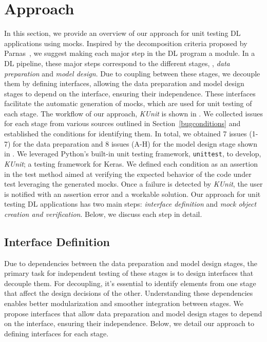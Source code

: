 \section{Approach}
\label{sec:Approach}


In this section, we provide an overview of our approach for unit testing DL applications using mocks.
Inspired by the decomposition criteria proposed by Parnas~\cite{parnas1972criteria}, we suggest making each major step in the DL program a module.
In a DL pipeline, these major steps correspond to the different stages, \ie, \textit{data preparation} and \textit{model design}.
Due to coupling between these stages, we decouple them by defining interfaces, allowing the data preparation and model design stages to depend on the interface, ensuring their independence. 
These interfaces facilitate the automatic generation of mocks, which are used for unit testing of each stage.
The workflow of our approach, {\em KUnit} is shown in .
We collected issues for each stage from various sources outlined in Section~\ref{bugconditions} and established the conditions for identifying them.
In total, we obtained 7 issues (1-7) for the data preparation
and 8 issues (A-H) for the model design stage shown in . 
We 
leveraged Python’s built-in unit testing framework, \texttt{unittest},
to develop, {\em KUnit}; a testing framework for Keras.
We defined each condition as an assertion in the test method aimed at verifying the expected behavior of the code under test leveraging the generated mocks.
Once a failure is detected by {\em KUnit}, the user is notified with an assertion error and a workable solution. 
Our approach 
for unit testing DL applications has two main steps: \textit{interface definition} and \textit{mock object creation and verification}. 
Below, we discuss each step in detail.


\subsection{Interface Definition}
Due to dependencies between the data preparation and model design stages, the primary task for independent testing of these stages is to design interfaces that decouple them. 
For decoupling, it's essential to identify elements from one stage that affect the design decisions of the other.
Understanding these dependencies enables better modularization and smoother integration between stages.
We propose interfaces that allow data preparation and model design stages to depend on the interface, ensuring their independence.
Below, we detail our approach to defining interfaces for each stage.


